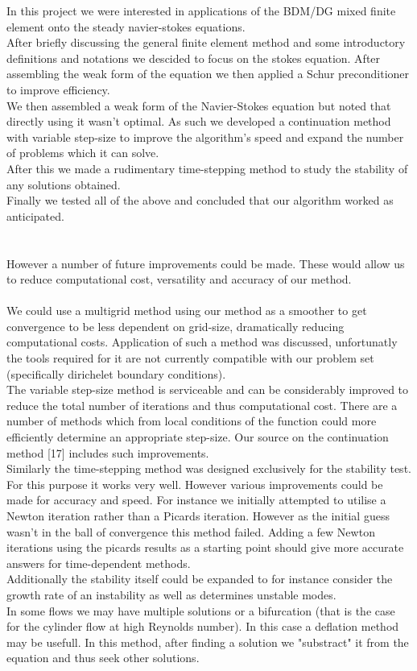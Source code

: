 \documentclass[11pt,twoside,a4paper]{article}
\begin{document}
In this project we were interested in applications of the BDM/DG mixed finite element onto the steady navier-stokes equations.\\
After briefly discussing the general finite element method and some introductory definitions and notations we descided to focus on the stokes equation. After assembling the weak form of the equation we then applied a Schur preconditioner to  improve efficiency.\\
We then assembled a weak form of the Navier-Stokes equation but noted that directly using it wasn't optimal. As such we developed a continuation method with variable step-size to improve the algorithm's speed and expand the number of problems which it can solve.\\
After this we made a rudimentary time-stepping method to study the stability of any solutions obtained.\\
Finally we tested all of the above and concluded that our algorithm worked as anticipated.\\
\\
\\
However a number of future improvements could be made.
These would allow us to reduce computational cost, versatility and accuracy of our method.\\
\\
We could use a multigrid method using our method as a smoother to get convergence to be less dependent on grid-size, dramatically reducing computational costs. Application of such a method was discussed, unfortunatly the tools required for it are not currently compatible with our problem set (specifically dirichelet boundary conditions).\\
The variable step-size method is serviceable and can be considerably improved to reduce the total number of iterations and thus computational cost. There are a number of methods which from local conditions of the function could more efficiently determine an appropriate step-size. Our source on the continuation method [17] includes such improvements.\\
Similarly the time-stepping method was designed exclusively for the stability test. For this purpose it works very well. However various improvements could be made for accuracy and speed. For instance we initially attempted to utilise a Newton iteration rather than a Picards iteration. However as the initial guess wasn't in the ball of convergence this method failed. Adding a few Newton iterations using the picards results as a starting point should give more accurate answers for time-dependent methods.\\
Additionally the stability itself could be expanded to for instance consider the growth rate of an instability as well as determines unstable modes.\\
In some flows we may have multiple solutions or a bifurcation (that is the case for the cylinder flow at high Reynolds number). In this case a deflation method may be usefull. In this method, after finding a solution we "substract" it from the equation and thus seek other solutions.\\
\\
\end{document}
